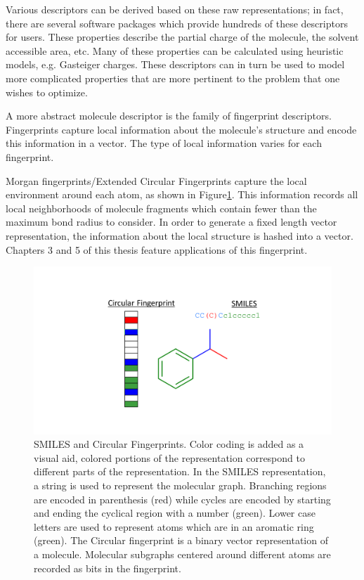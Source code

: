 Various descriptors can be derived based on these raw representations; in fact, there are several software packages which provide hundreds of these descriptors for users\cite{rdkit,mauri2006dragon}. These properties describe the partial charge of the molecule, the solvent accessible area, etc. Many of these properties can be calculated using heuristic models, e.g. Gasteiger charges. These descriptors can in turn be used to model more complicated properties that are more pertinent to the problem that one wishes to optimize\cite{mauri2006dragon}.

A more abstract molecule descriptor is the family of fingerprint descriptors. Fingerprints capture local information about the molecule's structure and encode this information in a vector. The type of local information varies for each fingerprint.

Morgan fingerprints/Extended Circular Fingerprints \cite{morgan1965generation,Rogers_2010_ECFP} capture the local environment around each atom, as shown in Figure\ref{fig:molecule_reps}. This information records all local neighborhoods of molecule fragments which contain fewer than the maximum bond radius to consider. In order to generate a fixed length vector representation, the information about the local structure is hashed into a vector. Chapters 3 and 5 of this thesis feature applications of this fingerprint.

\begin{figure}
\begin{center}
\includegraphics[width=0.9\columnwidth]{molecule_reps.png}
\caption[SMILES and Circular Fingerprint Molecular Representation]{
SMILES and Circular Fingerprints. Color coding is added as a visual aid, colored portions of
the representation correspond to different parts of the representation.
In the SMILES representation, a string is used to represent the molecular graph.
Branching regions are encoded in parenthesis (red) while cycles are encoded by starting and ending
the cyclical region with a number (green). Lower case letters are used to represent atoms which
are in an aromatic ring (green). The Circular fingerprint is a binary vector representation of a
molecule. Molecular subgraphs centered around different atoms are recorded as bits in the fingerprint.
}
\label{fig:molecule_reps}
\end{center}
\end{figure}


